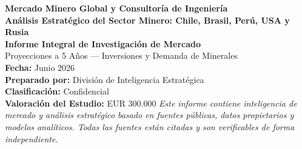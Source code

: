 \documentclass[11pt,letterpaper]{report}
\newcommand{\reporttitle}{Mercado Minero Global y Consultoría de Ingeniería}
\newcommand{\reportsubtitle}{Análisis Estratégico del Sector Minero: Chile, Brasil, Perú, USA y Rusia}
\newcommand{\reportdate}{Junio 2026}
\newcommand{\reportauthor}{División de Inteligencia Estratégica}
\newcommand{\reportclassification}{Confidencial}
\begin{document}
\begin{titlepage}
\centering
\vspace*{2cm}
{\Huge\bfseries\color{primaryblue} \reporttitle\\[0.5cm]}
{\LARGE\bfseries \reportsubtitle\\[1.5cm]}
\vspace{3cm}
{\Large\bfseries Informe Integral de Investigación de Mercado\\[0.5cm]}
{\large Proyecciones a 5 Años — Inversiones y Demanda de Minerales\\[3cm]}
{\large
\textbf{Fecha:} \reportdate\\[0.3cm]
\textbf{Preparado por:} \reportauthor\\[0.3cm]
\textbf{Clasificación:} \reportclassification\\[0.3cm]
\textbf{Valoración del Estudio:} EUR 300.000
}
\vfill
{\footnotesize
\textit{Este informe contiene inteligencia de mercado y análisis estratégico basado en fuentes públicas, datos propietarios y modelos analíticos. Todas las fuentes están citadas y son verificables de forma independiente.}
}
\end{titlepage}

\tableofcontents
\newpage
\listoffigures
\newpage
\listoftables
\newpage


















\end{document}

